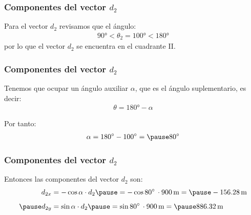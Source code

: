 \documentclass[12pt]{beamer}
\begin{document}
\begin{frame}
\frametitle{Componentes del vector $d_{2}$}
Para el vector $d_{2}$ revisamos que el ángulo:
\pause
\begin{eqnarray*}
\ang{90} < \theta_{2} = \ang{100} < \ang{180}
\end{eqnarray*}
\pause
por lo que el vector $d_{2}$ se encuentra en el cuadrante II.
\end{frame}
\begin{frame}
\frametitle{Componentes del vector $d_{2}$}
Tenemos que ocupar un ángulo auxiliar $\alpha$, que es el ángulo suplementario, es decir:
\pause
\begin{align*}
\theta = \ang{180} - \alpha
\end{align*}
\begin{minipage}{0.6\linewidth}
Por tanto:
\begin{eqnarray*}
\alpha = \ang{180} - \ang{100} = \pause \ang{80}
\end{eqnarray*}
\end{minipage}
\begin{minipage}{0.35\linewidth}
\begin{figure}
\centering
{}
\end{figure}
\end{minipage}
\end{frame}
\begin{frame}
\frametitle{Componentes del vector $d_{2}$}
\begin{figure}
\centering
{}
\end{figure}
Entonces las componentes del vector $d_{2}$ son:
\pause
\begin{eqnarray*}
\begin{aligned}
d_{2x} &= -\cos \alpha \cdot d_{2} \pause = -\cos \ang{80} \, \cdot \SI{900}{\meter} = \pause -\SI{156.28}{\meter} \\[0.5em] \pause
d_{2y} &= \sin \alpha \cdot d_{2} \pause = \sin \ang{80} \, \cdot \SI{900}{\meter} = \pause \SI{886.32}{\meter}
\end{aligned}
\end{eqnarray*}
\end{frame}
\end{document}
